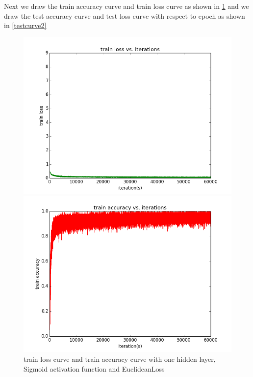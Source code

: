 \documentclass{elegantbook}
\begin{document}
Next we draw the train accuracy curve and train loss curve as shown in \ref{traincurve2} and we draw the test accuracy curve and test loss curve with respect to epoch as shown in \ref{testcurve2}
\begin{figure}[!ht]
	\centering
	\begin{minipage}[t]{0.45\textwidth}
		\centering
		\includegraphics[width=\textwidth]{trainloss1se}
	\end{minipage}
	\begin{minipage}[t]{0.45\textwidth}
		\centering
		\includegraphics[width=\textwidth]{trainacc1se}
	\end{minipage}
	\caption{\label{traincurve2}train loss curve and train accuracy curve with one hidden layer, Sigmoid activation function and EuclideanLoss}
\end{figure}
\end{document}
